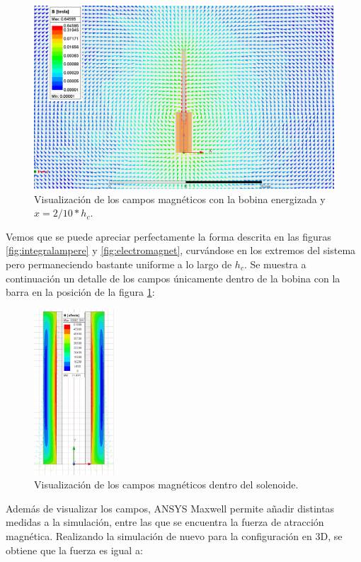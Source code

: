\begin{figure}[H]
    \centering
    \includegraphics[width=14cm]{FigurasMemoria/fields8.PNG}
    \caption{Visualización de los campos magnéticos con la bobina energizada y \(x=2/10 * h_c\).}
    \label{fig:fields8} %
\end{figure}

Vemos que se puede apreciar perfectamente la forma descrita en las figuras \ref{fig:integralampere} y \ref{fig:electromagnet}, curvándose en los extremos del sistema pero permaneciendo bastante uniforme a lo largo de \(h_c\). Se muestra a continuación un detalle de los campos únicamente dentro de la bobina con la barra en la posición de la figura \ref{fig:fields8}:

\begin{figure}[H]
    \centering
    \includegraphics[width=3cm]{FigurasMemoria/fieldsDetail.jpg}
    \caption{Visualización de los campos magnéticos dentro del solenoide.}
    \label{fig:fieldsDetail} %
\end{figure}

Además de visualizar los campos, ANSYS Maxwell permite añadir distintas medidas a la simulación, entre las que se encuentra la fuerza de atracción magnética. Realizando la simulación de nuevo para la configuración en 3D, se obtiene que la fuerza es igual a:

